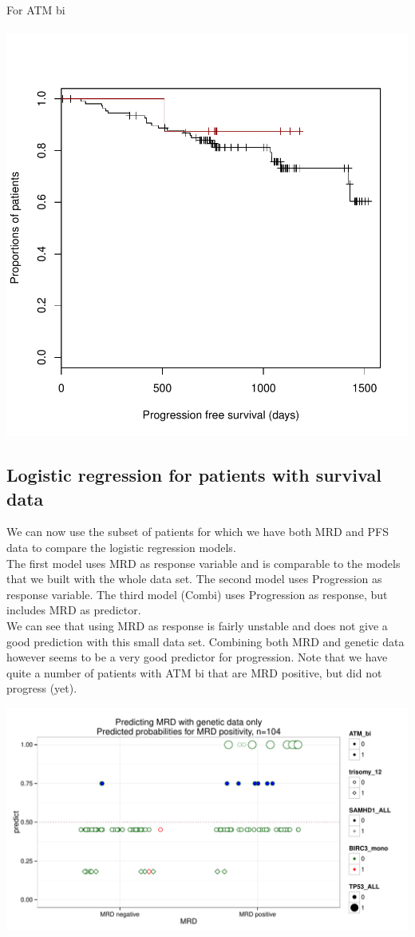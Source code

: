 \documentclass[a4paper,11pt]{article}
\begin{document}
\newpage
For ATM bi\\\
\\
\includegraphics{HICF1_Finalreportv6-041}
\subsection{Logistic regression for patients with survival data}
We can now use the subset of patients for which we have both MRD and PFS data to compare the logistic regression models.\\
The first model uses MRD as response variable and is comparable to the models that we built with the whole data set. The second model uses Progression as response variable. The third model (Combi) uses Progression as response, but includes MRD as predictor.\\
We can see that using MRD as response is fairly unstable and does not give a good prediction with this small data set. Combining both MRD and genetic data however seems to be a very good predictor for progression. Note that we have quite a number of patients with ATM bi that are MRD positive, but did not progress (yet).

\includegraphics{HICF1_Finalreportv6-043}
\end{document}
